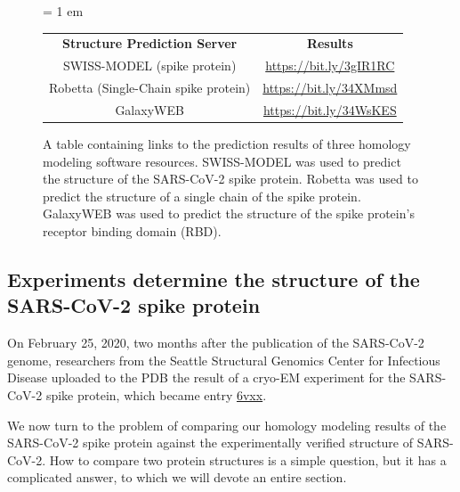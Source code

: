 \begin{figure}[h]
	\centering
	\tabcolsep = 1 em
	\mySfFamily
	\begin{tabular}{c c}
		\textbf{Structure Prediction Server} & \textbf{Results} \\
		SWISS-MODEL (spike protein) & \url{https://bit.ly/3gIR1RC} \\
		Robetta (Single-Chain spike protein) & \url{https://bit.ly/34XMmsd} \\
		GalaxyWEB & \url{https://bit.ly/34WsKES} \\
	\end{tabular}
	\caption{A table containing links to the prediction results of three homology modeling software resources. SWISS-MODEL was used to predict the structure of the SARS-CoV-2 spike protein. Robetta was used to predict the structure of a single chain of the spike protein. GalaxyWEB was used to predict the structure of the spike protein's receptor binding domain (RBD).}
	\label{fig:homology_modeling_results_table}
\end{figure}

\FloatBarrier

\subsection{Experiments determine the structure of the SARS-CoV-2 spike protein}

On February 25, 2020, two months after the publication of the SARS-CoV-2 genome, researchers from the Seattle Structural Genomics Center for Infectious Disease uploaded to the PDB the result of a cryo-EM experiment for the SARS-CoV-2 spike protein, which became entry \href{http://www.rcsb.org/structure/6VXX}{6vxx}.\\

\begin{note}\end{note}
	
We now turn to the problem of comparing our homology modeling results of the SARS-CoV-2 spike protein against the experimentally verified structure of SARS-CoV-2. How to compare two protein structures is a simple question, but it has a complicated answer, to which we will devote an entire section.\\

\FloatBarrier
{}

